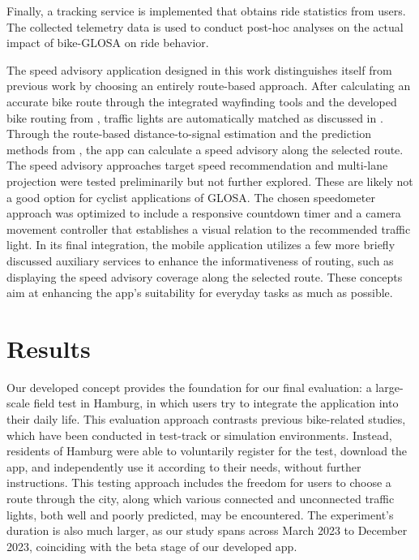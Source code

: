 Finally, a tracking service is implemented that obtains ride statistics from users. The collected telemetry data is used to conduct post-hoc analyses on the actual impact of bike-GLOSA on ride behavior.

\begin{Summary}
The speed advisory application designed in this work distinguishes itself from previous work by choosing an entirely route-based approach. After calculating an accurate bike route through the integrated wayfinding tools and the developed bike routing from , traffic lights are automatically matched as discussed in . Through the route-based distance-to-signal estimation and the prediction methods from , the app can calculate a speed advisory along the selected route. The speed advisory approaches target speed recommendation and multi-lane projection were tested preliminarily but not further explored. These are likely not a good option for cyclist applications of GLOSA. The chosen speedometer approach was optimized to include a responsive countdown timer and a camera movement controller that establishes a visual relation to the recommended traffic light. In its final integration, the mobile application utilizes a few more briefly discussed auxiliary services to enhance the informativeness of routing, such as displaying the speed advisory coverage along the selected route. These concepts aim at enhancing the app's suitability for everyday tasks as much as possible. 
\end{Summary}

\section{Results}

Our developed concept provides the foundation for our final evaluation: a large-scale field test in Hamburg, in which users try to integrate the application into their daily life. This evaluation approach contrasts previous bike-related studies, which have been conducted in test-track or simulation environments. Instead, residents of Hamburg were able to voluntarily register for the test, download the app, and independently use it according to their needs, without further instructions. This testing approach includes the freedom for users to choose a route through the city, along which various connected and unconnected traffic lights, both well and poorly predicted, may be encountered. The experiment's duration is also much larger, as our study spans across March 2023 to December 2023, coinciding with the beta stage of our developed app.

